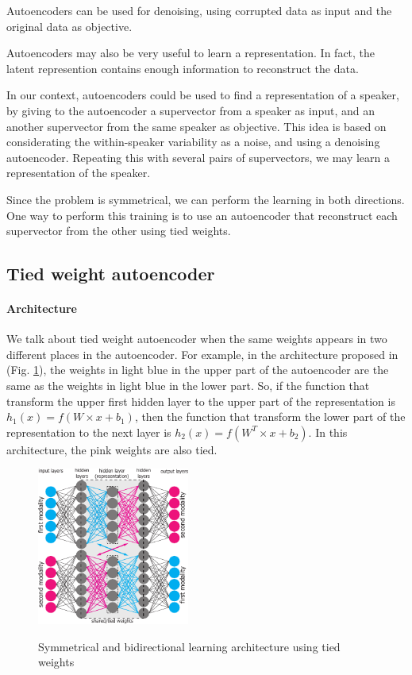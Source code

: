 \documentclass[conference]{IEEEtran}
\begin{document}
Autoencoders can be used for denoising, using corrupted data as input and the original data as objective.

Autoencoders may also be very useful to learn a representation. In fact, the latent represention contains enough information to reconstruct the data.

In our context, autoencoders could be used to find a representation of a speaker, by giving to the autoencoder a supervector from a speaker as input, and an another supervector from the same speaker as objective. This idea is based on considerating the within-speaker variability as a noise, and using a denoising autoencoder. Repeating this with several pairs of supervectors, we may learn a representation of the speaker. 

Since the problem is symmetrical, we can perform the learning in both directions. One way to perform this training is to use an autoencoder that reconstruct each supervector from the other using tied weights.

\subsection{Tied weight autoencoder}

\paragraph{Architecture}

We talk about tied weight autoencoder when the same weights appears in two different places in the autoencoder. For example, in the architecture proposed in \cite{vukotic:hal-01314302}
(Fig. \ref{archi_vedran}), the weights in light blue in the upper part of the autoencoder are the same as the weights in light blue in the lower part. So, if the function that transform the upper first hidden layer to the upper part of the representation is $h_1(x) = f(W \times x + b_1)$, then  the function that transform the lower part of the representation to the next layer is $h_2(x) = f(W^T \times x + b_2)$. In this architecture, the pink weights are also tied.

\begin{figure}[!h]
    \centering
    \caption{Symmetrical and bidirectional learning architecture using tied weights}
    \includegraphics[width=5cm]{archi-vedran.pdf}
    \label{archi_vedran}
\end{figure}
\end{document}
